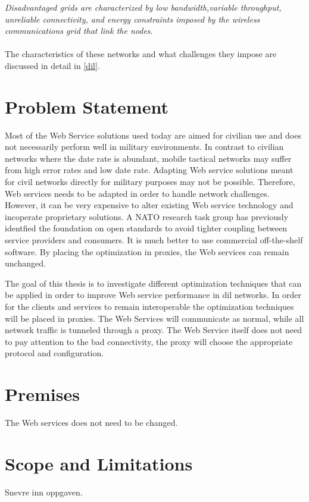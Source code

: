 \documentclass[USenglish]{ifimaster}
\begin{document}
\textit{
Disadvantaged grids are characterized by low bandwidth,variable throughput,
unreliable connectivity, and energy constraints imposed by the wireless
communications grid that link the nodes}\cite{nato-disadvantaged-grids}.
\paragraph{}
The characteristics of these networks and what challenges they impose are
discussed in detail in \cref{dil}.

\section{Problem Statement}
Most of the Web Service solutions used today are aimed for civilian use and does
not necessarily perform well in military environments. In contrast to civilian
networks where the date rate is abundant, mobile tactical networks may suffer
from high error rates and low date rate. Adapting Web service solutions meant
for civil networks directly for military purposes may not be possible.
Therefore, Web services needs to be adapted in order to handle network
challenges. However, it can be very expensive to alter existing Web service
technology and incoperate proprietary solutions. A NATO research task group has
previously identfied the foundation on open standards to avoid tighter coupling
between service providers and consumers\cite{IST-090}. It is much better to use
commercial off-the-shelf software. By placing the optimization in proxies, the
Web services can remain unchanged.

The goal of this thesis is to investigate different optimization techniques that
can be applied in order to improve Web service performance in \gls{dil}
networks. In order for the clients and services to remain interoperable the
optimization techniques will be placed in proxies. The Web Services will
communicate as normal, while all network traffic is tunneled through a proxy.
The Web Service itself does not need to pay attention to the bad connectivity,
the proxy will choose the appropriate protocol and configuration.

\section{Premises}
The Web services does not need to be changed.

\section{Scope and Limitations} Snevre inn oppgaven.
\end{document}
